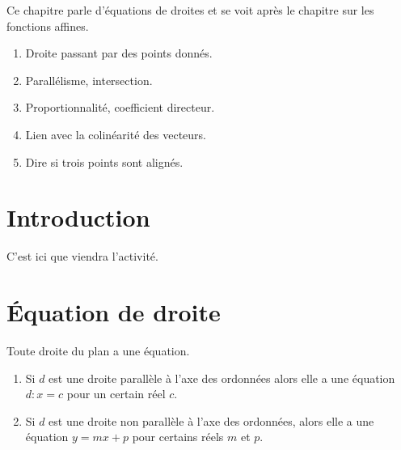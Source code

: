 

Ce chapitre parle d'équations de droites et se voit après le chapitre sur les fonctions affines.
\begin{enumerate}
    \item
        Droite passant par des points donnés.
    \item 
        Parallélisme, intersection.
    \item
        Proportionnalité, coefficient directeur.
    \item
        Lien avec la colinéarité des vecteurs.
    \item
        Dire si trois points sont alignés.
\end{enumerate}

\section*{Introduction}

C'est ici que viendra l'activité.

\section{Équation de droite}

\begin{theorem}
    Toute droite du plan a une équation.
    \begin{enumerate}
        \item
            Si \( d\) est une droite parallèle à l'axe des ordonnées alors elle a une équation \( d:x=c\) pour un certain réel \( c\).
        \item
            Si \( d\) est une droite non parallèle à l'axe des ordonnées, alors elle a une équation \( y=mx+p\) pour certains réels \( m\) et \( p\).
    \end{enumerate}
\end{theorem}


